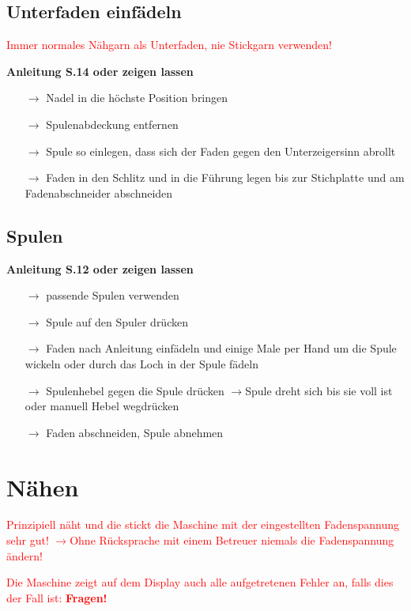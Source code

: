 \documentclass{\basedir/fablab-document}
\newcommand{\pfeil}{\ensuremath{\rightarrow}}
\begin{document}
\subsection{Unterfaden einfädeln}
\textcolor{red}{Immer normales Nähgarn als Unterfaden, nie Stickgarn verwenden!}

\vspace{1em}
\textbf{Anleitung S.14 oder zeigen lassen}
\begin{itemize}
 \item[\pfeil] Nadel in die höchste Position bringen
 \item[\pfeil] Spulenabdeckung entfernen
 \item[\pfeil] Spule so einlegen, dass sich der Faden gegen den Unterzeigersinn abrollt
 \item[\pfeil] Faden in den Schlitz und in die Führung legen bis zur Stichplatte und am Fadenabschneider abschneiden
\end{itemize}

\subsection{Spulen}
\textbf{Anleitung S.12 oder zeigen lassen}
\begin{itemize}
 \item[\pfeil] passende Spulen verwenden
 \item[\pfeil] Spule auf den Spuler drücken
 \item[\pfeil] Faden nach Anleitung einfädeln und einige Male per Hand um die Spule wickeln oder durch das Loch in der Spule fädeln
 \item[\pfeil] Spulenhebel gegen die Spule drücken \pfeil Spule dreht sich bis sie voll ist oder manuell Hebel wegdrücken
 \item[\pfeil] Faden abschneiden, Spule abnehmen
\end{itemize}

\pagebreak
\section{Nähen}

\textcolor{red}{Prinzipiell näht und die stickt die Maschine mit der eingestellten Fadenspannung sehr gut! }
\textcolor{red}{\newline \pfeil Ohne Rücksprache mit einem Betreuer niemals die Fadenspannung ändern!}

\vspace{1em}

\textcolor{red}{Die Maschine zeigt auf dem Display auch alle aufgetretenen Fehler an, falls dies der Fall ist: \textbf{Fragen!}}
\end{document}

